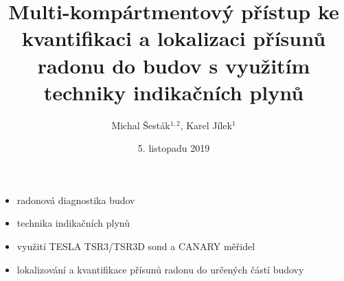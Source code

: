 \documentclass[10pt]{beamer}
\author{Michal Šesták$^{1,2}$, Karel Jílek$^{1}$}
\title{Multi-kompártmentový přístup ke kvantifikaci a lokalizaci přísunů radonu do budov s využitím techniky indikačních plynů}
\institute{$^{1}$SÚRO\\$^{2}$FJFI ČVUT v Praze}
\date{5. listopadu 2019}
\begin{document}
\maketitle

\begin{frame}
    \begin{itemize}
        \item radonová diagnostika budov
        \item technika indikačních plynů
        \item využití TESLA TSR3/TSR3D sond a CANARY měřidel
        \item lokalizování a kvantifikace přísunů radonu do určených částí budovy
    \end{itemize}
\end{frame}


\end{document}
